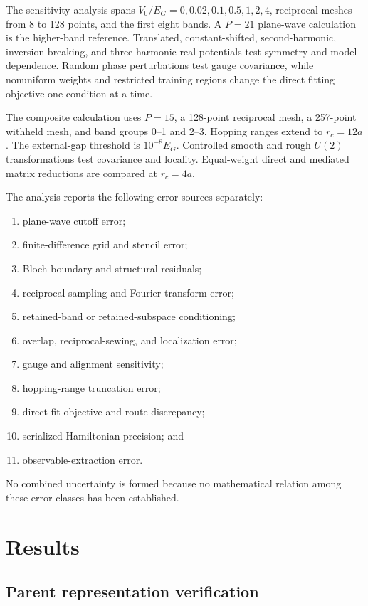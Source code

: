 The sensitivity analysis spans $V_0/E_G=0,0.02,0.1,0.5,1,2,4$, reciprocal
meshes from 8 to 128 points, and the first eight bands. A $P=21$ plane-wave
calculation is the higher-band reference. Translated, constant-shifted,
second-harmonic, inversion-breaking, and three-harmonic real potentials test
symmetry and model dependence. Random phase perturbations test gauge covariance,
while nonuniform weights and restricted training regions change the direct
fitting objective one condition at a time.

The composite calculation uses $P=15$, a 128-point reciprocal mesh, a 257-point
withheld mesh, and band groups 0--1 and 2--3. Hopping ranges extend to
$r_c=12a$. The external-gap threshold is $10^{-8}E_G$. Controlled smooth and
rough $U(2)$ transformations test covariance and locality. Equal-weight direct
and mediated matrix reductions are compared at $r_c=4a$.

The analysis reports the following error sources separately:
\begin{enumerate}
    \item plane-wave cutoff error;
    \item finite-difference grid and stencil error;
    \item Bloch-boundary and structural residuals;
    \item reciprocal sampling and Fourier-transform error;
    \item retained-band or retained-subspace conditioning;
    \item overlap, reciprocal-sewing, and localization error;
    \item gauge and alignment sensitivity;
    \item hopping-range truncation error;
    \item direct-fit objective and route discrepancy;
    \item serialized-Hamiltonian precision; and
    \item observable-extraction error.
\end{enumerate}
No combined uncertainty is formed because no mathematical relation among these
error classes has been established.

\section{Results}

\subsection{Parent representation verification}

